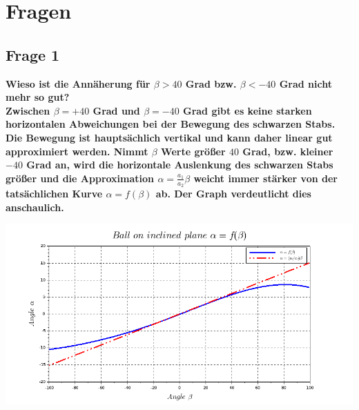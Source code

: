 \section{Fragen}
\subsection{Frage 1}
\bfseries Wieso ist die Annäherung für $\beta > 40$ Grad bzw. $\beta < -40$ Grad nicht mehr so gut? \\
\mdseries Zwischen $\beta=+40$ Grad und $\beta=-40$ Grad gibt es keine starken horizontalen Abweichungen bei der Bewegung des schwarzen Stabs. Die Bewegung ist hauptsächlich vertikal und kann daher linear gut approximiert werden. Nimmt $\beta$ Werte größer $40$ Grad, bzw. kleiner $-40$ Grad an, wird die horizontale Auslenkung des schwarzen Stabs größer und die Approximation $\alpha=\frac{a_1}{a_2}\beta$ weicht immer stärker von der tatsächlichen Kurve $\alpha = f(\beta)$ ab. Der Graph verdeutlicht dies anschaulich.
\begin{center}
	\begin{minipage}{\linewidth}
		\centering
		\includegraphics[scale=0.45]{images/plot1_1.png}
	\end{minipage}
\end{center}


